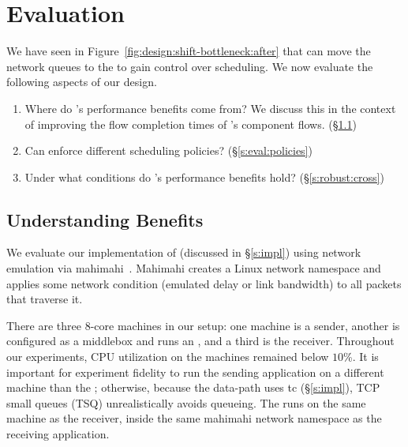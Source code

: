 \section{Evaluation}\label{s:eval}

We have seen in Figure~\ref{fig:design:shift-bottleneck:after} that \name can move the network queues to the \inbox to gain control over scheduling. 
We now evaluate the following aspects of our design.
\begin{enumerate}
    \item Where do \name's performance benefits come from? We discuss this in the context of improving the flow completion times of \name's component flows. (\S\ref{s:eval:fct})
    \item Can \name enforce different scheduling policies? (\S\ref{s:eval:policies})
    \item Under what conditions do \name's performance benefits hold? (\S\ref{s:robust:cross})
\end{enumerate}

\subsection{Understanding Benefits}\label{s:eval:fct}

We evaluate our implementation of \name (discussed in \S\ref{s:impl}) using network emulation via mahimahi~\cite{mahimahi}.
Mahimahi creates a Linux network namespace and applies some network condition (emulated delay or link bandwidth) to all packets that traverse it.

There are three $8$-core machines in our setup: one machine is a sender, another is configured as a middlebox and runs an \inbox, and a third is the receiver. Throughout our experiments, CPU utilization on the machines remained below $10$\%.
It is important for experiment fidelity to run the sending application on a different machine than the \inbox; otherwise, because the \inbox data-path uses tc (\S\ref{s:impl}), TCP small queues (TSQ) unrealistically avoids queueing.
The \outbox runs on the same machine as the receiver, inside the same mahimahi network namespace as the receiving application.

